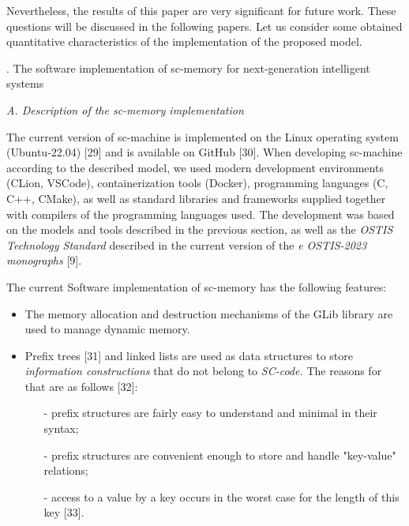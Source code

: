 \documentclass{article}
\begin{document}
\begin{multicols}{2}
Nevertheless, the results of this paper are very significant for future work. These questions will be discussed
in the following papers. Let us consider some obtained
quantitative characteristics of the implementation of the
proposed model.
\begin{center}



 \MakeUppercase{.} The software implementation of sc-memory for
next-generation intelligent systems

\end{center}

\textit{A. Description of the sc-memory implementation}

The current version of sc-machine is implemented on
the Linux operating system (Ubuntu-22.04) [29] and is
available on GitHub [30]. When developing sc-machine
according to the described model, we used modern
development environments (CLion, VSCode), containerization tools (Docker), programming languages (C, C++,
CMake), as well as standard libraries and frameworks
supplied together with compilers of the programming
languages used. The development was based on the
models and tools described in the previous section, as well as the \textit{OSTIS Technology Standard} described in the
current version of the \textit{e OSTIS-2023 monographs} [9].

The current Software implementation of sc-memory
has the following features:

\begin{itemize}
\itemsep = 0mm
\item The memory allocation and destruction mechanisms
of the GLib library are used to manage dynamic
memory.
\item Prefix trees [31] and linked lists are used as data
structures to store \textit{information constructions} that do
not belong to \textit{SC-code.} The reasons for that are as
follows [32]:

\begin{itemize}
\itemsep=0mm
\item[-]prefix structures are fairly easy to understand and
minimal in their syntax;


\item[-]prefix structures are convenient enough to store
and handle "key-value" relations;

\item[-]access to a value by a key occurs in the worst
case for the length of this key [33].


\end{itemize}
\end{itemize}
\end{multicols}
\end{document}
